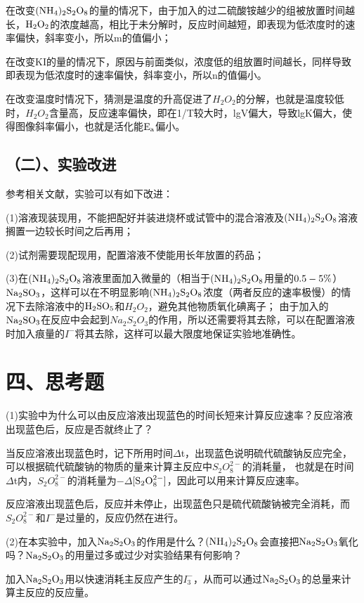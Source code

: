 \documentclass[a4paper,12pt]{article}
\begin{document}
在改变$\rm (NH_4)_2S_2O_8$的量的情况下，由于加入的过二硫酸铵越少的组被放置时间越长，$\rm H_2O_2$的浓度越高，相比于未分解时，反应时间越短，即表现为低浓度时的速率偏快，斜率变小，所以m的值偏小；

在改变KI的量的情况下，原因与前面类似，浓度低的组放置时间越长，同样导致即表现为低浓度时的速率偏快，斜率变小，所以n的值偏小。

在改变温度时情况下，猜测是温度的升高促进了$H_2O_2$的分解，也就是温度较低时，$H_2O_2$含量高，反应速率偏快，即在1/T较大时，lgV偏大，导致lgK偏大，使得图像斜率偏小，也就是活化能$\rm E_a$偏小。

\subsection*{（二）、实验改进}
参考相关文献，实验可以有如下改进：

(1)溶液现装现用，不能把配好并装进烧杯或试管中的混合溶液及$\rm (NH_4)_2S_2O_8$溶液搁置一边较长时间之后再用；

(2)试剂需要现配现用，配置溶液不使能用长年放置的药品；

(3)在$\rm (NH_4)_2S_2O_8$溶液里面加入微量的（相当于$\rm (NH_4)_2S_2O_8$用量的$\rm 0.5-5\%$）$\rm Na_2SO_3$，这样可以在不明显影响$\rm (NH_4)_2S_2O_8$浓度（两者反应的速率极慢）的情况下去除溶液中的$\rm H_2SO_5$和$H_2O_2$，避免其他物质氧化碘离子；
由于加入的$\rm Na_2SO_3$在反应中会起到$Na_2S_2O_3$的作用，所以还需要将其去除，可以在配置溶液时加入痕量的$I^-$将其去除，这样可以最大限度地保证实验地准确性\textsuperscript{\cite{HXYJ200002038}}。

\section*{四、思考题}
(1)实验中为什么可以由反应溶液出现蓝色的时间长短来计算反应速率？反应溶液出现蓝色后，反应是否就终止了？

当反应溶液出现蓝色时，记下所用时间$\Delta$t，出现蓝色说明硫代硫酸钠反应完全，可以根据硫代硫酸钠的物质的量来计算主反应中$S_2O_8^{2-}$的消耗量，
也就是在时间$\Delta$t内，$S_2O_8^{2-}$的消耗量为$-\Delta$$\rm [S_2O_8^{2-}]$，因此可以用来计算反应速率。

反应溶液出现蓝色后，反应并未停止，出现蓝色只是硫代硫酸钠被完全消耗，而$S_2O_8^{2-}$和$I^-$是过量的，反应仍然在进行。

(2)在本实验中，加入$\rm Na_2S_2O_3$的作用是什么？$\rm (NH_4)_2S_2O_8$会直接把$\rm Na_2S_2O_3$氧化吗？$\rm Na_2S_2O_3$的用量过多或过少对实验结果有何影响？

加入$\rm Na_2S_2O_3$用以快速消耗主反应产生的$I_3^-$，从而可以通过$\rm Na_2S_2O_3$的总量来计算主反应的反应量。
\end{document}
